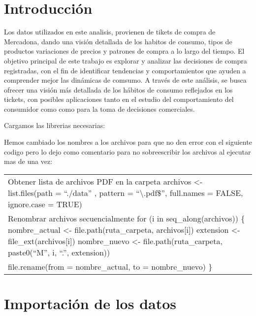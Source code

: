 \documentclass[,,,oneauthor,pdftex]{Definitions/mdpi}
\begin{document}

\hypertarget{introducciuxf3n}{%
\section{Introducción}\label{introducciuxf3n}}

Los datos utilizados en este analisis, provienen de tikets de compra de
Mercadona, dando una visión detallada de los habitos de consumo, tipos
de productos variaciones de precios y patrones de compra a lo largo del
tiempo. El objetivo principal de este trabajo es explorar y analizar las
decisiones de compra registradas, con el fin de identificar tendencias y
comportamientos que ayuden a comprender mejor las dinámicas de comsumo.
A través de este análisis, se busca ofrecer una visión más detallada de
los hábitos de consumo reflejados en los tickets, con posibles
aplicaciones tanto en el estudio del comportamiento del consumidor como
como para la toma de decisiones comerciales.

Cargamos las librerias necesarias:

Hemos cambiado los nombres a los archivos para que no den error con el
siguiente codigo pero lo dejo como comentario para no sobreescribir los
archivos al ejecutar mas de una vez:

\begin{longtable}[]{@{}
  >{\centering\arraybackslash}p{}@{}}
\toprule\noalign{}
\endhead
\bottomrule\noalign{}
\endlastfoot
Obtener lista de archivos PDF en la carpeta archivos \textless-
list.files(path = ``./data'' , pattern = ``\textbackslash.pdf\$'',
full.names = FALSE, ignore.case = TRUE) \\
Renombrar archivos secuencialmente for (i in seq\_along(archivos)) \{
nombre\_actual \textless- file.path(ruta\_carpeta, archivos{[}i{]})
extension \textless- file\_ext(archivos{[}i{]}) nombre\_nuevo \textless-
file.path(ruta\_carpeta, paste0(``M'', i, ``.'', extension)) \\
file.rename(from = nombre\_actual, to = nombre\_nuevo) \} \\
\end{longtable}

\hypertarget{importaciuxf3n-de-los-datos}{%
\section{Importación de los datos}\label{importaciuxf3n-de-los-datos}}
\end{document}
